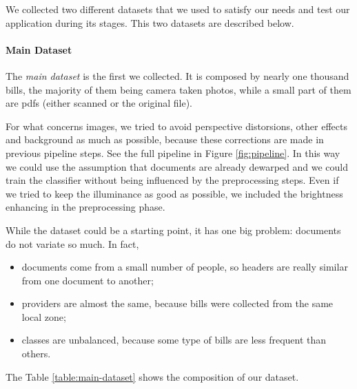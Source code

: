 \documentclass[10pt,twocolumn,letterpaper]{article}
\begin{document}
We collected two different datasets that we used to satisfy our needs
and test our application during its stages. This two datasets are
described below.

\paragraph{Main Dataset}
\label{par:main-dataset}

The \emph{main dataset} is the first we collected. It is
composed by nearly one thousand bills, the majority of them being
camera taken photos, while a small part of them are pdfs (either
scanned or the original file).

For what concerns images, we tried to avoid perspective distorsions, other
effects and background as much as possible, because
these corrections are made in previous pipeline steps. See the full
pipeline in Figure \ref{fig:pipeline}.  In this way we could use the
assumption that documents are already dewarped and we could train the
classifier without being influenced by the preprocessing steps. Even if
we tried to keep the illuminance as good as possible, we included the brightness enhancing in the preprocessing phase.

While the dataset could be a starting point, it has one big
problem: documents do not variate so much. In fact,
\begin{itemize}
  \item documents come from a small number of people, so headers are
    really similar from one document to another;
  \item providers are almost the same, because bills were collected
    from the same local zone;
  \item classes are unbalanced, because some type of bills are less
    frequent than others.
\end{itemize}

The Table \ref{table:main-dataset} shows the composition of our
dataset.
\end{document}
